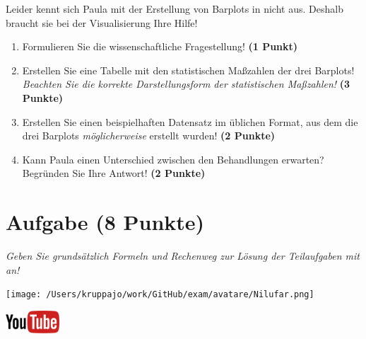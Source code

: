 \documentclass[a4paper, 9pt]{scrartcl}\usepackage[]{graphicx}\usepackage[]{xcolor}
\begin{document}
Leider kennt sich Paula mit der Erstellung von Barplots in \Rlogo nicht aus. Deshalb braucht sie bei der Visualisierung Ihre Hilfe!

\begin{enumerate}
\item Formulieren Sie die wissenschaftliche Fragestellung! \textbf{(1 Punkt)}
\item Erstellen Sie eine Tabelle mit den statistischen Maßzahlen der drei Barplots! \textit{Beachten Sie die korrekte Darstellungsform der statistischen Maßzahlen!} \textbf{(3 Punkte)}
\item Erstellen Sie einen beispielhaften Datensatz im \Rlogo üblichen Format, aus dem die drei Barplots \textit{möglicherweise} erstellt wurden! \textbf{(2 Punkte)}
\item Kann Paula einen Unterschied zwischen den Behandlungen erwarten? Begründen Sie Ihre Antwort! \textbf{(2 Punkte)}
\end{enumerate} 
\clearpage

\section{Aufgabe \hfill (8 Punkte)}

\textit{Geben Sie grundsätzlich Formeln und Rechenweg zur Lösung der Teilaufgaben mit an!} \\[1Ex]
 

 
\begin{minipage}[t]{0.5\textwidth}
\texttt{[image: /Users/kruppajo/work/GitHub/exam/avatare/Nilufar.png]}
\end{minipage}
\begin{minipage}[t]{0.5\textwidth}
\hfill
\href{https://youtu.be/vXnLttRL_VI}{\includegraphics[width = 2cm]{img/youtube}}\\[1Ex]
\end{minipage}
\vspace{1ex}
\end{document}
